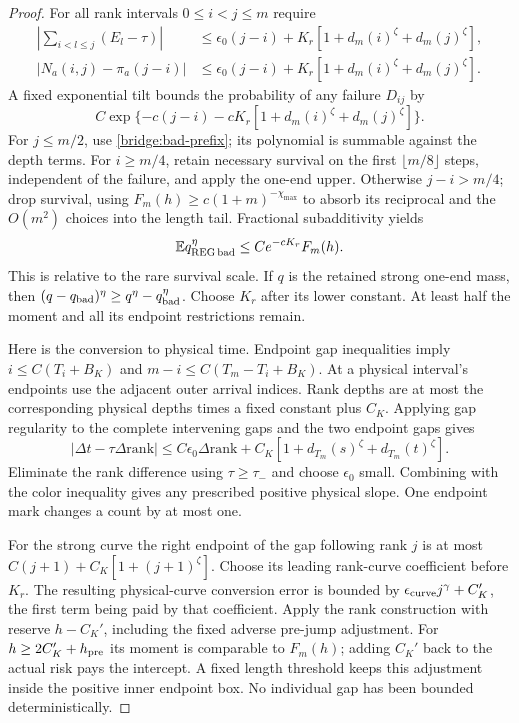 \begin{proof}
For all rank intervals $0\le i<j\le m$ require
\begin{align*}
 \left|\sum_{i<l\le j}(E_l-\tau)\right|
 &\le\epsilon_0(j-i)+K_r[1+d_m(i)^\zeta+d_m(j)^\zeta],\\
 |N_a(i,j)-\pi_a(j-i)|
 &\le\epsilon_0(j-i)+K_r[1+d_m(i)^\zeta+d_m(j)^\zeta].
\end{align*}
A fixed exponential tilt bounds the probability of any failure $D_{ij}$ by
\[
 C\exp\{-c(j-i)-cK_r[1+d_m(i)^\zeta+d_m(j)^\zeta]\}.
\]
For $j\le m/2$, use \eqref{bridge:bad-prefix}; its polynomial is
summable against the depth terms. For $i\ge m/4$, retain necessary
survival on the first $\lfloor m/8\rfloor$ steps, independent of the
failure, and apply the one-end upper. Otherwise $j-i>m/4$; drop
survival, using $F_m(h)\ge c(1+m)^{-\chi_{\max}}$ to absorb its
reciprocal and the $O(m^2)$ choices into the length tail. Fractional
subadditivity yields
\begin{equation}
 \mathbb E q_{\rm REG\,bad}^{\eta}
           \le Ce^{-cK_r}F_m(h).\label{bridge:relative-delete}
\end{equation}
This is relative to the rare survival scale. If $q$ is the retained
strong one-end mass, then
$(q-q_{\rm bad})^\eta\ge q^\eta-q_{\rm bad}^\eta$.
Choose $K_r$ after its lower constant. At least half the moment and
all its endpoint restrictions remain.

Here is the conversion to physical time. Endpoint gap inequalities
imply $i\le C(T_i+B_K)$ and
$m-i\le C(T_m-T_i+B_K)$. At a physical interval's endpoints use
the adjacent outer arrival indices. Rank depths are at most the
corresponding physical depths times a fixed constant plus $C_K$.
Applying gap regularity to the complete intervening gaps and the two
endpoint gaps gives
\[
 |\Delta t-\tau\Delta\mathrm{rank}|
 \le C\epsilon_0\Delta\mathrm{rank}
       +C_K[1+d_{T_m}(s)^\zeta+d_{T_m}(t)^\zeta].
\]
Eliminate the rank difference using $\tau\ge\tau_-$ and choose
$\epsilon_0$ small. Combining with the color inequality gives any
prescribed positive physical slope. One endpoint mark changes a count
by at most one.

For the strong curve the right endpoint of the gap following rank $j$
is at most $C(j+1)+C_K[1+(j+1)^\zeta]$. Choose its leading rank-curve
coefficient before $K_r$. The resulting physical-curve conversion
error is bounded by $\epsilon_{\rm curve}j^\gamma+C_K'$, the first
term being paid by that coefficient. Apply the rank construction
with reserve $h-C_K'$, including the fixed adverse pre-jump adjustment.
For $h\ge2C_K'+h_{\rm pre}$ its moment is comparable to $F_m(h)$;
adding $C_K'$ back to the actual risk pays the intercept. A fixed
length threshold keeps this adjustment inside the positive inner
endpoint box. No individual gap has been bounded deterministically.
\end{proof}

